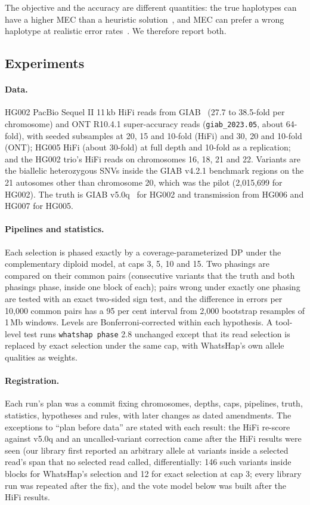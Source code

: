 The objective and the accuracy are different quantities: the true haplotypes
can have a higher MEC than a heuristic solution~\cite{duitama2012}, and MEC
can prefer a wrong haplotype at realistic error rates~\cite{majidian2020}. We
therefore report both.

\subsection{Experiments}\label{sec:seldesign}

\paragraph{Data.} HG002 PacBio Sequel II 11\,kb HiFi reads from
GIAB~\cite{zook2016,wagner2022} (27.7 to 38.5-fold per chromosome) and ONT
R10.4.1 super-accuracy reads (\texttt{giab\_2023.05}, about 64-fold), with
seeded subsamples at 20, 15 and 10-fold (HiFi) and 30, 20 and 10-fold (ONT);
HG005 HiFi (about 30-fold) at full depth and 10-fold as a replication; and
the HG002 trio's HiFi reads on chromosomes 16, 18, 21 and 22. Variants are
the biallelic heterozygous SNVs inside the GIAB v4.2.1 benchmark regions on
the 21 autosomes other than chromosome 20, which was the pilot (2{,}015{,}699
for HG002). The truth is GIAB v5.0q~\cite{hansen2026} for HG002 and
transmission from HG006 and HG007 for HG005.

\paragraph{Pipelines and statistics.} Each selection is phased exactly by a
coverage-parameterized DP under the complementary diploid model, at caps 3,
5, 10 and 15. Two phasings are compared on their common pairs (consecutive
variants that the truth and both phasings phase, inside one block of each);
pairs wrong under exactly one phasing are tested with an exact two-sided sign
test, and the difference in errors per 10{,}000 common pairs has a 95 per
cent interval from 2{,}000 bootstrap resamples of 1\,Mb windows. Levels are
Bonferroni-corrected within each hypothesis. A tool-level test runs
\texttt{whatshap phase} 2.8 unchanged except that its read selection is
replaced by exact selection under the same cap, with WhatsHap's own allele
qualities as weights.

\paragraph{Registration.} Each run's plan was a commit fixing chromosomes,
depths, caps, pipelines, truth, statistics, hypotheses and rules, with later
changes as dated amendments. The exceptions to ``plan before data'' are
stated with each result: the HiFi re-score against v5.0q and an
uncalled-variant correction came after the HiFi results were seen (our
library first reported an arbitrary allele at variants inside a selected
read's span that no selected read called, differentially: 146 such variants
inside blocks for WhatsHap's selection and 12 for exact selection at cap 3;
every library run was repeated after the fix), and the vote model below was
built after the HiFi results.

